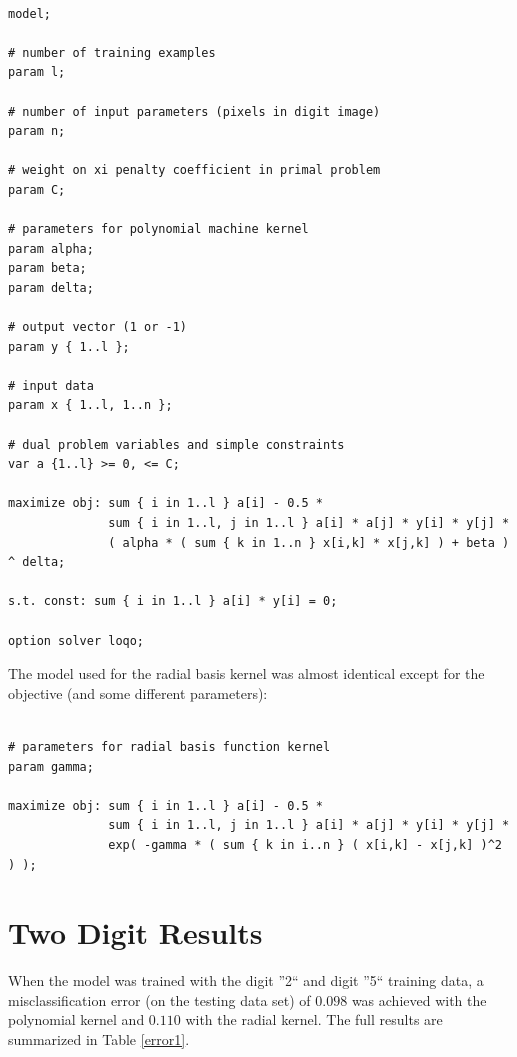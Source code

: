 \documentclass{article}
\begin{document}
\begin{verbatim}

model;

# number of training examples
param l;

# number of input parameters (pixels in digit image)
param n;

# weight on xi penalty coefficient in primal problem
param C;

# parameters for polynomial machine kernel
param alpha;
param beta;
param delta;

# output vector (1 or -1)
param y { 1..l };

# input data
param x { 1..l, 1..n };

# dual problem variables and simple constraints
var a {1..l} >= 0, <= C;

maximize obj: sum { i in 1..l } a[i] - 0.5 *
              sum { i in 1..l, j in 1..l } a[i] * a[j] * y[i] * y[j] *
              ( alpha * ( sum { k in 1..n } x[i,k] * x[j,k] ) + beta ) ^ delta;

s.t. const: sum { i in 1..l } a[i] * y[i] = 0;

option solver loqo;

\end{verbatim}

The model used for the radial basis kernel was almost identical except for the objective (and some different parameters):

\begin{verbatim}

# parameters for radial basis function kernel
param gamma;

maximize obj: sum { i in 1..l } a[i] - 0.5 *
              sum { i in 1..l, j in 1..l } a[i] * a[j] * y[i] * y[j] *
              exp( -gamma * ( sum { k in i..n } ( x[i,k] - x[j,k] )^2 ) );

\end{verbatim}

\section{Two Digit Results}\label{Results2}

When the model was trained with the digit ''2`` and digit ''5`` training data, a misclassification error (on the testing data set) of \(0.098\) was achieved with the polynomial kernel and \(0.110\) with the radial kernel. The full results are summarized in Table \ref{error1}.
\end{document}
